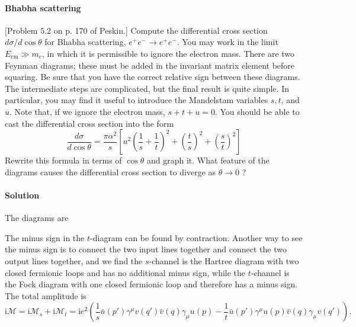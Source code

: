 \documentclass[hyperref, a4paper]{article}
\newcommand*{\ii}{\mathrm{i}}
\begin{document}
\paragraph{}

\paragraph{Bhabha scattering} [Problem $5.2$ on p. 170 of Peskin.] Compute the differential cross section $d \sigma / d \cos \theta$ for Bhabha scattering, $e^{+} e^{-} \rightarrow e^{+} e^{-}$. You may work in the limit $E_{\mathrm{cm}} \gg m_{e}$, in which it is permissible to ignore the electron mass. There are two Feynman diagrams; these must be added in the invariant matrix element before squaring. Be sure that you have the correct relative sign between these diagrams. The intermediate steps are complicated, but the final result is quite simple. In particular, you may find it useful to introduce the Mandelstam variables $s, t$, and $u$. Note that, if we ignore the electron mass, $s+t+u=0$. You should be able to cast the differential cross section into the form
\[
\frac{d \sigma}{d \cos \theta}=\frac{\pi \alpha^{2}}{s}\left[u^{2}\left(\frac{1}{s}+\frac{1}{t}\right)^{2}+\left(\frac{t}{s}\right)^{2}+\left(\frac{s}{t}\right)^{2}\right]
\]
Rewrite this formula in terms of $\cos \theta$ and graph it. What feature of the diagrams causes the differential cross section to diverge as $\theta \rightarrow 0$ ?

\paragraph{Solution} The diagrams are 


The minus sign in the $t$-diagram can be found by contraction. Another way to see the minus sign is to connect the 
two input lines together and connect the two output lines together, and we find the $s$-channel is the Hartree 
diagram with two closed fermionic loops and has no additional minus sign, while the $t$-channel is the Fock diagram
with one closed fermionic loop and therefore has a minus sign.
The total amplitude is 
\begin{equation}
    \ii \mathcal{M} = \ii \mathcal{M}_s + \ii \mathcal{M}_t = \ii e^2 \left( \frac{1}{s} \bar{u}(p') \gamma^\mu v(q') \bar{v}(q) \gamma_\mu u(p) - \frac{1}{t} \bar{u}(p') \gamma^\mu u(p) \bar{v}(q) \gamma_\mu v(q') \right).
\end{equation}
\end{document}
